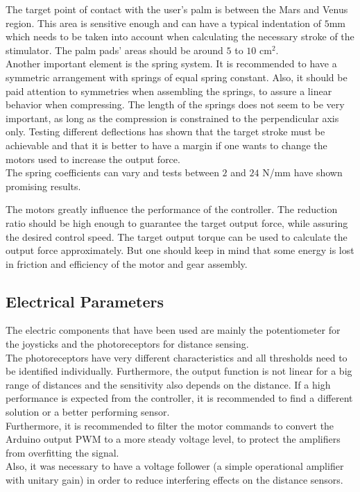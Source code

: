The target point of contact with the user's palm is between the Mars and Venus region. This area is sensitive enough and can have a typical indentation of $5$mm which needs to be taken into account when calculating the necessary stroke of the stimulator. The palm pads' areas should be around $5$ to $10$ cm$^2$.\\

Another important element is the spring system. It is recommended to have a symmetric arrangement with springs of equal spring constant. Also, it should be paid attention to symmetries when assembling the springs, to assure a linear behavior when compressing. The length of the springs does not seem to be very important, as long as the compression is constrained to the perpendicular axis only. Testing different deflections has shown that the target stroke must be achievable and that it is better to have a margin if one wants to change the motors used to increase the output force.\\
The spring coefficients can vary and tests between $2$ and $24$ N/mm have shown promising results. 

The motors greatly influence the performance of the controller. The reduction ratio should be high enough to guarantee the target output force, while assuring the desired control speed. The target output torque can be used to calculate the output force approximately. But one should keep in mind that some energy is lost in friction and efficiency of the motor and gear assembly.

\subsection{Electrical Parameters}
The electric components that have been used are mainly the potentiometer for the joysticks and the photoreceptors for distance sensing.\\
The photoreceptors have very different characteristics and all thresholds need to be identified individually. Furthermore, the output function is not linear for a big range of distances and the sensitivity also depends on the distance. If a high performance is expected from the controller, it is recommended to find a different solution or a better performing sensor.\\
Furthermore, it is recommended to filter the motor commands to convert the Arduino output PWM to a more steady voltage level, to protect the amplifiers from overfitting the signal.\\
Also, it was necessary to have a voltage follower (a simple operational amplifier with unitary gain) in order to reduce interfering effects on the distance sensors.


\newpage